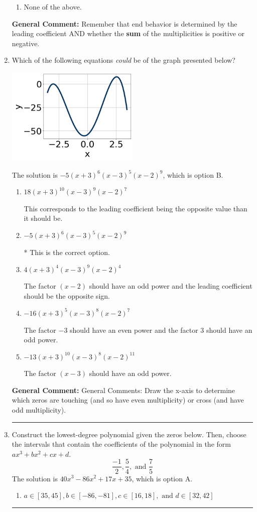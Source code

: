 \documentclass{extbook}[14pt]
\newcommand{\litem}[1]{\item #1

\rule{\textwidth}{0.4pt}}
\begin{document}
\begin{enumerate}
{\begin{enumerate}[label=\Alph*.]
\begin{multicols}{2}
\end{multicols}\item None of the above.\end{enumerate}
\textbf{General Comment:} Remember that end behavior is determined by the leading coefficient AND whether the \textbf{sum} of the multiplicities is positive or negative.
}
\litem{
Which of the following equations \textit{could} be of the graph presented below?

\begin{center}
    \includegraphics[width=0.5\textwidth]{../Figures/polyGraphToFunctionCopyA.png}
\end{center}


The solution is \( -5(x + 3)^{6} (x - 3)^{5} (x - 2)^{9} \), which is option B.\begin{enumerate}[label=\Alph*.]
\item \( 18(x + 3)^{10} (x - 3)^{9} (x - 2)^{7} \)

This corresponds to the leading coefficient being the opposite value than it should be.
\item \( -5(x + 3)^{6} (x - 3)^{5} (x - 2)^{9} \)

* This is the correct option.
\item \( 4(x + 3)^{4} (x - 3)^{9} (x - 2)^{4} \)

The factor $(x - 2)$ should have an odd power and the leading coefficient should be the opposite sign.
\item \( -16(x + 3)^{5} (x - 3)^{8} (x - 2)^{7} \)

The factor $-3$ should have an even power and the factor $3$ should have an odd power.
\item \( -13(x + 3)^{10} (x - 3)^{8} (x - 2)^{11} \)

The factor $(x - 3)$ should have an odd power.
\end{enumerate}

\textbf{General Comment:} General Comments: Draw the x-axis to determine which zeros are touching (and so have even multiplicity) or cross (and have odd multiplicity).
}
\litem{
Construct the lowest-degree polynomial given the zeros below. Then, choose the intervals that contain the coefficients of the polynomial in the form $ax^3+bx^2+cx+d$.
\[ \frac{-1}{2}, \frac{5}{4}, \text{ and } \frac{7}{5} \]The solution is \( 40x^{3} -86 x^{2} +17 x + 35 \), which is option A.\begin{enumerate}[label=\Alph*.]
\item \( a \in [35, 45], b \in [-86, -81], c \in [16, 18], \text{ and } d \in [32, 42] \)


\end{enumerate}}
\end{enumerate}
\end{document}
